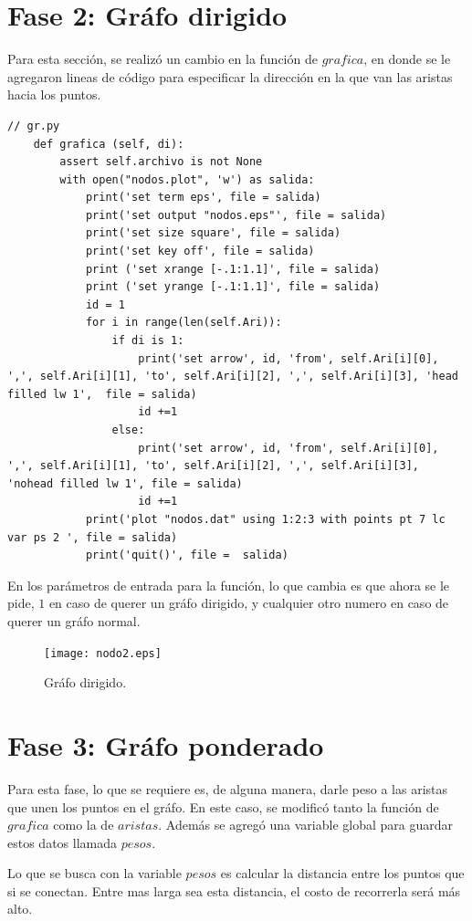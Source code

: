 \documentclass{article}%
\begin{document}
\section*{Fase 2: Gr\'afo dirigido}

Para esta secci\'on, se realiz\'o un cambio en la funci\'on de $grafica$, en donde se le agregaron lineas de c\'odigo para especificar la direcci\'on en la que van las aristas hacia los puntos.

\begin{lstlisting}
// gr.py
	def grafica (self, di):
		assert self.archivo is not None
		with open("nodos.plot", 'w') as salida: 
			print('set term eps', file = salida)
			print('set output "nodos.eps"', file = salida)
			print('set size square', file = salida)
			print('set key off', file = salida)
			print ('set xrange [-.1:1.1]', file = salida)
			print ('set yrange [-.1:1.1]', file = salida)
			id = 1
			for i in range(len(self.Ari)):
				if di is 1:
					print('set arrow', id, 'from', self.Ari[i][0], ',', self.Ari[i][1], 'to', self.Ari[i][2], ',', self.Ari[i][3], 'head filled lw 1',  file = salida)
					id +=1
				else:
					print('set arrow', id, 'from', self.Ari[i][0], ',', self.Ari[i][1], 'to', self.Ari[i][2], ',', self.Ari[i][3], 'nohead filled lw 1', file = salida)
					id +=1
			print('plot "nodos.dat" using 1:2:3 with points pt 7 lc var ps 2 ', file = salida)
			print('quit()', file =  salida)
\end{lstlisting}

En los par\'ametros de entrada para la funci\'on, lo que cambia es que ahora se le pide, $1$ en caso de querer un gr\'afo dirigido, y cualquier otro numero en caso de querer un gr\'afo normal. 

\begin{figure}[h]

\centering
\texttt{[image: nodo2.eps]}
\caption{Gr\'afo dirigido.}
\end{figure}

\section*{Fase 3: Gr\'afo ponderado}

Para esta fase, lo que se requiere es, de alguna manera, darle peso a las aristas que unen los puntos en el gr\'afo. En este caso, se modific\'o tanto la funci\'on de $grafica$ como la de $aristas$. Adem\'as se agreg\'o una variable global para guardar estos datos llamada $pesos$.

Lo que se busca con la variable $pesos$ es calcular la distancia entre los puntos que si se conectan. Entre mas larga sea esta distancia, el costo de recorrerla ser\'a m\'as alto.
\end{document}
